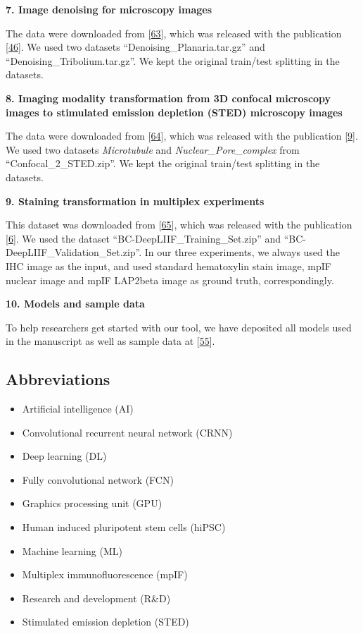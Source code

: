 \textbf{7. Image denoising for microscopy images}

The data were downloaded from {[}\protect\hyperlink{ref-b6GmFJlO}{63}{]}, which was released with the publication {[}\protect\hyperlink{ref-12G712Zky}{46}{]}. We used two datasets ``Denoising\_Planaria.tar.gz'' and ``Denoising\_Tribolium.tar.gz''. We kept the original train/test splitting in the datasets.

\textbf{8. Imaging modality transformation from 3D confocal microscopy images to stimulated emission depletion (STED) microscopy images}

The data were downloaded from {[}\protect\hyperlink{ref-ExHf2uD2}{64}{]}, which was released with the publication {[}\protect\hyperlink{ref-UEBDZ3tI}{9}{]}. We used two datasets \emph{Microtubule} and \emph{Nuclear\_Pore\_complex} from ``Confocal\_2\_STED.zip''. We kept the original train/test splitting in the datasets.

\textbf{9. Staining transformation in multiplex experiments}

This dataset was downloaded from {[}\protect\hyperlink{ref-cjAzGPun}{65}{]}, which was released with the publication {[}\protect\hyperlink{ref-WwenuBHa}{6}{]}. We used the dataset ``BC-DeepLIIF\_Training\_Set.zip'' and ``BC-DeepLIIF\_Validation\_Set.zip''. In our three experiments, we always used the IHC image as the input, and used standard hematoxylin stain image, mpIF nuclear image and mpIF LAP2beta image as ground truth, correspondingly.

\textbf{10. Models and sample data}

To help researchers get started with our tool, we have deposited all models used in the manuscript as well as sample data at {[}\protect\hyperlink{ref-FBoj3fXM}{55}{]}.

\hypertarget{abbreviations}{%
\subsection{Abbreviations}\label{abbreviations}}

\begin{itemize}
\tightlist
\item
  Artificial intelligence (AI)
\item
  Convolutional recurrent neural network (CRNN)
\item
  Deep learning (DL)
\item
  Fully convolutional network (FCN)
\item
  Graphics processing unit (GPU)
\item
  Human induced pluripotent stem cells (hiPSC)
\item
  Machine learning (ML)
\item
  Multiplex immunofluorescence (mpIF)
\item
  Research and development (R\&D)
\item
  Stimulated emission depletion (STED)
\end{itemize}

